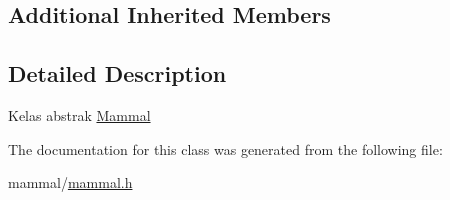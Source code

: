 \subsection*{Additional Inherited Members}


\subsection{Detailed Description}
Kelas abstrak \hyperlink{classMammal}{Mammal} 

The documentation for this class was generated from the following file\+:\begin{DoxyCompactItemize}
\item 
mammal/\hyperlink{mammal_8h}{mammal.\+h}\end{DoxyCompactItemize}
